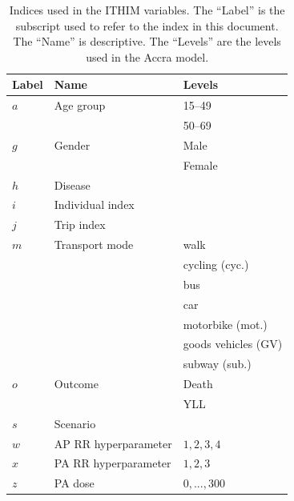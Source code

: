 \documentclass{article}
\begin{document}
\begin{table}[ht]
\begin{center}
\caption{\small Indices used in the ITHIM variables. The ``Label'' is the subscript used to refer to the index in this document. The ``Name'' is descriptive. The ``Levels'' are the levels used in the Accra model.}
\begin{tabular}{lll}
\label{indices}
Label & Name & Levels  \\
\hline
$a$ & Age group & 15--49 \\
&  & 50--69  \\
$g$ & Gender & Male \\
&  & Female  \\
$h$ & Disease &  \\
$i$ & Individual index &  \\
$j$ & Trip index & \\
$m$ & Transport mode& walk  \\
&& cycling (cyc.)  \\
&& bus \\
&& car  \\
&& motorbike (mot.)  \\
&& goods vehicles (GV)  \\
&& subway (sub.)  \\
$o$ & Outcome & Death  \\
& & YLL  \\
$s$ & Scenario & \\
$w$ & AP RR hyperparameter & $1,2,3,4$ \\
$x$ & PA RR hyperparameter & $1,2,3$ \\
$z$ & PA dose & $0,...,300$ \\
\hline
\end{tabular}
\end{center}
\end{table}
\end{document}
